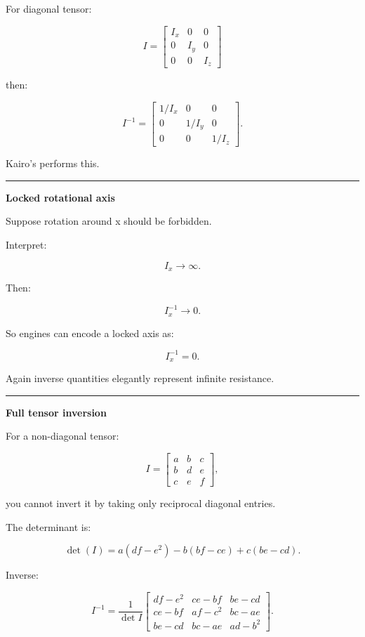 For diagonal tensor:

\[
I=
\begin{bmatrix}
I_x&0&0\\
0&I_y&0\\
0&0&I_z
\end{bmatrix}
\]

then:

\[
\boxed{
I^{-1}
=
\begin{bmatrix}
1/I_x&0&0\\
0&1/I_y&0\\
0&0&1/I_z
\end{bmatrix}.
}
\]

Kairo's  performs this.

\begin{center}\rule{0.5\linewidth}{0.5pt}\end{center}

\textbf{Locked rotational axis}

Suppose rotation around x should be forbidden.

Interpret:

\[
I_x\rightarrow\infty.
\]

Then:

\[
I_x^{-1}\rightarrow0.
\]

So engines can encode a locked axis as:

\[
I_x^{-1}=0.
\]

Again inverse quantities elegantly represent infinite resistance.

\begin{center}\rule{0.5\linewidth}{0.5pt}\end{center}

\textbf{Full tensor inversion}

For a non-diagonal tensor:

\[
I=
\begin{bmatrix}
a&b&c\\
b&d&e\\
c&e&f
\end{bmatrix},
\]

you cannot invert it by taking only reciprocal diagonal entries.

The determinant is:

\[
\det(I)
=
a(df-e^2)
-
b(bf-ce)
+
c(be-cd).
\]

Inverse:

\[
I^{-1}
=
\frac1{\det I}
\begin{bmatrix}
df-e^2 & ce-bf & be-cd\\
ce-bf & af-c^2 & bc-ae\\
be-cd & bc-ae & ad-b^2
\end{bmatrix}.
\]

